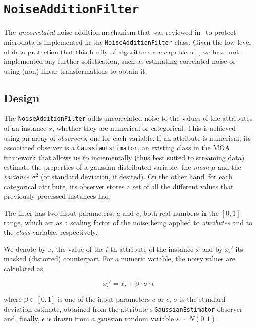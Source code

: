 \section{\texttt{NoiseAdditionFilter}}
\label{Implementation:NoiseAddition}

The \textit{uncorrelated} noise addition mechanism that was reviewed in~ to protect microdata is implemented in the \texttt{NoiseAdditionFilter} class. Given the low level of data protection that this family of algorithms are capable of~\citep{Brand:NoiseAddition}, we have not implemented any further sofistication, such as estimating correlated noise or using (non)-linear transformations to obtain it.

\subsection{Design}
\label{Implementation:NoiseAddition:Design}

The \texttt{NoiseAdditionFilter} adds uncorrelated noise to the values of the attributes of an instance $x$, whether they are numerical or categorical. This is achieved using an array of \textit{observers}, one for each variable. If an attribute is numerical, its associated observer is a \texttt{GaussianEstimator}, an existing class in the MOA framework that allows us to incrementally (thus best suited to streaming data) estimate the properties of a gaussian distributed variable: the \textit{mean} $\mu$ and the \textit{variance} $\sigma^2$ (or standard deviation, if desired). On the other hand, for each categorical attribute, its observer stores a set of all the different values that previously processed instances had.

The filter has two input parameters: $a$ and $c$, both real numbers in the $[0,1]$ range, which act as a scaling factor of the noise being applied to \textit{attributes} and to the \textit{class} variable, respectively.

We denote by $x_i$ the value of the $i$-th attribute of the instance $x$ and by $x_i'$ its masked (distorted) counterpart. For a numeric variable, the noisy values are calculated as

\begin{equation}
x_i' = x_i + \beta\cdot\sigma\cdot\epsilon
\end{equation}

where $\beta \in [0,1]$ is one of the input parameters $a$ or $c$, $\sigma$ is the standard deviation estimate, obtained from the attribute's \texttt{GaussianEstimator} observer and, finally, $\epsilon$ is drawn from a gaussian random variable $\varepsilon \sim N(0,1)$.

